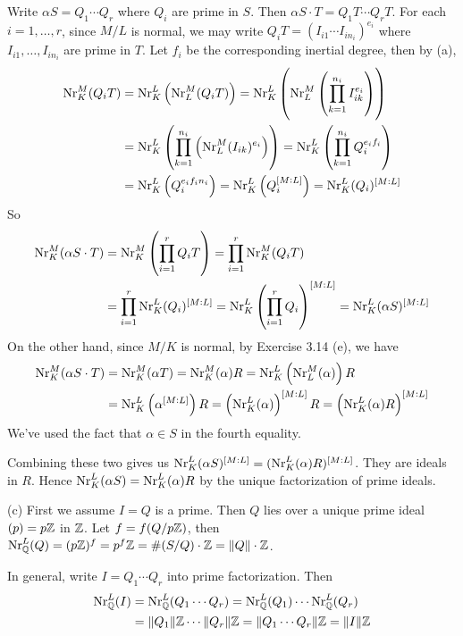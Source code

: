 \documentclass[../Marcus.tex]{subfiles}
\begin{document}
Write $\alpha S=Q_1\cdots Q_r$ where $Q_i$ are prime in $S$. Then $\alpha S\cdot T=Q_1T\cdots Q_rT$. For each $i=1,\ldots,r$, since $M/L$ is normal, we may write $Q_iT=(I_{i1}\cdots I_{in_i})^{e_i}$ where $I_{i1},\ldots,I_{in_i}$ are prime in $T$. Let $f_i$ be the corresponding inertial degree, then by (a),
\begin{align*}
    \operatorname{Nr}^M_K(Q_iT)
	&= \operatorname{Nr}^L_K\left(\operatorname{Nr}^M_L(Q_iT)\right)
	= \operatorname{Nr}^L_K\left(\operatorname{Nr}^M_L\left(\prod_{k=1}^{n_i} I_{ik}^{e_i}\right)\right)    \\
    &= \operatorname{Nr}^L_K\left(\prod_{k=1}^{n_i}\left(\operatorname{Nr}^M_L (I_{ik})^{e_i}\right)\right)
	= \operatorname{Nr}^L_K\left(\prod_{k=1}^{n_i} Q_i^{e_if_i}\right)     \\
    &= \operatorname{Nr}^L_K\left(Q_i^{e_if_in_i}\right)
	= \operatorname{Nr}^L_K\left(Q_i^{[M:L]}\right)
	= \operatorname{Nr}^L_K(Q_i)^{[M:L]}
\end{align*}
So
\begin{align*}
    \operatorname{Nr}^M_K(\alpha S\cdot T)
	&= \operatorname{Nr}^M_K\left(\prod_{i=1}^r Q_iT\right)
	= \prod_{i=1}^r \operatorname{Nr}^M_K(Q_iT)    \\
	&= \prod_{i=1}^r \operatorname{Nr}^L_K(Q_i)^{[M:L]}
    = \operatorname{Nr}^L_K\left(\prod_{i=1}^r Q_i\right)^{[M:L]}
	= \operatorname{Nr}^L_K(\alpha S)^{[M:L]}
\end{align*}
On the other hand, since $M/K$ is normal, by Exercise 3.14 (e), we have
\begin{align*}
    \operatorname{Nr}^M_K(\alpha S\cdot T)
	&= \operatorname{Nr}^M_K(\alpha T)
	= \operatorname{Nr}^M_K(\alpha)R
	= \operatorname{Nr}^L_K\left(\operatorname{Nr}^M_L(\alpha)\right)R     \\
    &= \operatorname{Nr}^L_K\left(\alpha^{[M:L]}\right)R
	= \left(\operatorname{Nr}^L_K(\alpha)\right)^{[M:L]}R
	= \left(\operatorname{Nr}^L_K(\alpha)R\right)^{[M:L]} 
\end{align*}
We've used the fact that $\alpha\in S$ in the fourth equality.

Combining these two gives us $\operatorname{Nr}^L_K(\alpha S)^{[M:L]}=(\operatorname{Nr}^L_K(\alpha)R)^{[M:L]}$. They are ideals in $R$. Hence $\operatorname{Nr}^L_K(\alpha S)=\operatorname{Nr}^L_K(\alpha)R$ by the unique factorization of prime ideals.

(c) First we assume $I=Q$ is a prime. Then $Q$ lies over a unique prime ideal $(p)=p\mathbb{Z}$ in $\mathbb{Z}$. Let $f=f(Q/p\mathbb{Z})$, then $\operatorname{Nr}^L_{\mathbb{Q}}(Q)=(p\mathbb{Z})^f=p^f\mathbb{Z}=\#(S/Q)\cdot\mathbb{Z}=\|Q\|\cdot\mathbb{Z}$.

In general, write $I=Q_1\cdots Q_r$ into prime factorization. Then
\begin{align*}
	\operatorname{Nr}^L_{\mathbb{Q}}(I)
	&= \operatorname{Nr}^L_{\mathbb{Q}}(Q_1\cdots Q_r)
	= \operatorname{Nr}^L_{\mathbb{Q}}(Q_1)\cdots\operatorname{Nr}^L_{\mathbb{Q}}(Q_r)    \\
	&= \|Q_1\|\mathbb{Z}\cdots\|Q_r\|\mathbb{Z}
	= \|Q_1\cdots Q_r\|\mathbb{Z}
	= \|I\|\mathbb{Z}
\end{align*}
\end{document}
